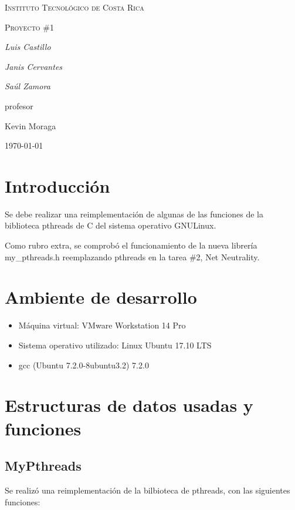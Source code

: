 \documentclass{article}
\begin{document}
\begin{titlepage}
  \centering
  {\scshape\LARGE Instituto Tecnol\'ogico de Costa Rica \par}
  \vspace{1cm}
  {\scshape\Large Proyecto \#1\par}
  \vspace{1.5cm}
  {\Large\itshape Luis Castillo\par}
  {\Large\itshape Janis Cervantes\par}
  {\Large\itshape Sa\'ul Zamora\par}
  \vfill
  profesor\par
  Kevin Moraga \textsc{}

  \vfill

  {\large \today\par}
\end{titlepage}

\section{Introducci\'on}
Se debe realizar una re\-implementaci\'on de algunas de las funciones de la biblioteca pthreads de C del sistema operativo GNU\/Linux.

Como rubro extra, se comprob\'o el funcionamiento de la nueva librer\'ia my\_pthreads.h reemplazando pthreads en la tarea \#2, Net Neutrality.

\section{Ambiente de desarrollo}
\begin{itemize}
  \item M\'aquina virtual: VMware Workstation 14 Pro
  \item Sistema operativo utilizado: Linux Ubuntu 17.10 LTS
  \item gcc (Ubuntu 7.2.0-8ubuntu3.2) 7.2.0
\end{itemize}

\section{Estructuras de datos usadas y funciones}
\subsection{MyPthreads}
Se realiz\'o una reimplementaci\'on de la bilbioteca de pthreads, con las siguientes funciones:
\end{document}
